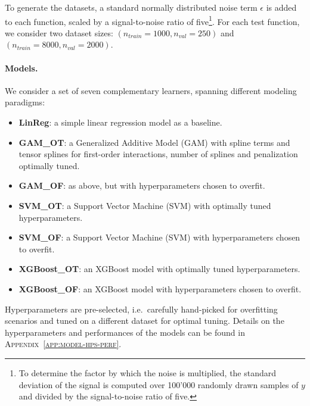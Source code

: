 \documentclass[runningheads]{llncs}
\begin{document}
\noindent To generate the datasets, a standard normally distributed noise term $\epsilon$ is added to each function,
scaled by a signal-to-noise ratio of five\footnote{To determine the factor by which the noise is multiplied,
    the standard deviation of the signal is computed over 100'000 randomly drawn samples of $y$ and divided by
    the signal-to-noise ratio of five.}. For each test function, we consider two dataset sizes:
$(n_{train}=1000, n_{val}=250)$ and $(n_{train}=8000, n_{val}=2000)$.

\paragraph{Models.}
We consider a set of seven complementary learners, spanning different modeling
paradigms:

\begin{itemize}[label=--]
    \item \textbf{LinReg}: a simple linear regression model as a baseline.
    \item \textbf{GAM\_OT}: a Generalized Additive Model (GAM) with spline terms
          and tensor splines for first-order interactions, number of splines
          and penalization optimally tuned.
    \item \textbf{GAM\_OF}: as above, but with hyperparameters chosen to overfit.
    \item \textbf{SVM\_OT}: a Support Vector Machine (SVM) with optimally tuned hyperparameters.
    \item \textbf{SVM\_OF}: a Support Vector Machine (SVM) with hyperparameters chosen to overfit.
    \item \textbf{XGBoost\_OT}: an XGBoost model with optimally tuned hyperparameters.
    \item \textbf{XGBoost\_OF}: an XGBoost model with hyperparameters chosen to overfit.
\end{itemize}

\noindent Hyperparameters are pre-selected, i.e.\ carefully hand-picked for overfitting scenarios
and tuned on a different dataset for optimal tuning. Details on the hyperparameters and performances
of the models can be found in \textsc{Appendix~\ref{app:model-hps-perf}}.
\end{document}
